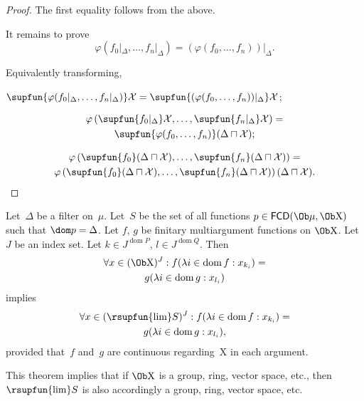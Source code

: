 \begin{proof}
  The first equality follows from the above.
  
  It remains to prove \[ \varphi (f_0 |_{\Delta}, \ldots, f_n |_{\Delta}) =
  (\varphi (f_0, \ldots, f_n)) |_{\Delta}. \]
  
  Equivalently transforming,
  
  $\supfun{\varphi (f_0 |_{\Delta}, \ldots, f_n |_{\Delta})} \mathcal{X} =
  \supfun{(\varphi (f_0, \ldots, f_n)) |_{\Delta}} \mathcal{X}$;
  
\begin{multline*}
  \varphi \left( \supfun{f_0 |_{\Delta}} \mathcal{X}, \ldots, \supfun{f_n
  |_{\Delta}} \mathcal{X} \right) =\\ \supfun{\varphi (f_0, \ldots, f_n)}
  (\Delta \sqcap \mathcal{X});
\end{multline*}
  
\begin{multline*}
  \varphi \left( \supfun{f_0} (\Delta \sqcap \mathcal{X}), \ldots,
  \supfun{f_n} (\Delta \sqcap \mathcal{X}) \right) =\\ \varphi \left(
  \supfun{f_0} (\Delta \sqcap \mathcal{X}), \ldots, \supfun{f_n} (\Delta
  \sqcap \mathcal{X}) \right) (\Delta \sqcap \mathcal{X}).
\end{multline*}
\end{proof}

\begin{thm}
Let~$\Delta$ be a filter on~$\mu$.
Let~$S$ be the set of all functions $p\in\mathsf{FCD}(\Ob\mu,\Ob\mathrm{X})$
such that $\dom p=\Delta$.
Let $f$, $g$ be
finitary multiargument functions on $\Ob\mathrm{X}$.
Let $J$ be an index
set. Let $k \in J^{\operatorname{dom} P}$, $l \in J^{\operatorname{dom} Q}$. Then
\begin{multline*}
\forall x \in (\Ob\mathrm{X})^J : f (\lambda i \in \operatorname{dom} f : x_{k_i}) =\\ g (\lambda
   i \in \operatorname{dom} g : x_{l_i})
\end{multline*}
implies
\begin{multline*}
   \forall x \in (\rsupfun{\lim}S)^J : f (\lambda i \in
   \operatorname{dom} f : x_{k_i}) =\\ g (\lambda i \in \operatorname{dom} g : x_{l_i}) ,
\end{multline*}
provided that~$f$ and~$g$ are continuous regarding~$\mathrm{X}$ in each argument.
\end{thm}

\begin{rem}
This theorem implies that if $\Ob\mathrm{X}$ is a group, ring, vector space, etc., then $\rsupfun{\lim}S$ is also accordingly a group, ring, vector space, etc.
\end{rem}

